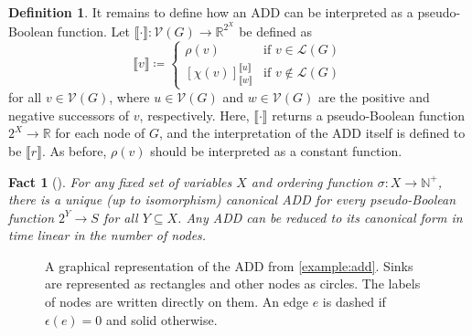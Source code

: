 \documentclass{article}
\newtheorem{fact}{Fact}
\theoremstyle{definition}
\newtheorem{definition}{Definition}
\theoremstyle{remark}
\begin{document}
\begin{definition}
  It remains to define how an ADD can be interpreted as a pseudo-Boolean
  function. Let $\llbracket \cdot \rrbracket\colon \mathcal{V}(G) \to
  \mathbb{R}^{2^X}$ be defined as
  \[
    \llbracket v \rrbracket \coloneqq
    \begin{cases}
      \rho(v) & \text{if } v \in \mathcal{L}(G) \\
      [\chi(v)]^{\llbracket u \rrbracket}_{\llbracket w \rrbracket} &
      \text{if } v \not\in \mathcal{L}(G)
    \end{cases}
  \]
  for all $v \in \mathcal{V}(G)$, where $u \in \mathcal{V}(G)$ and $w \in
  \mathcal{V}(G)$ are the positive and negative successors of $v$, respectively.
  Here, $\llbracket \cdot \rrbracket$ returns a pseudo-Boolean function $2^X \to
  \mathbb{R}$ for each node of $G$, and the interpretation of the ADD itself is
  defined to be $\llbracket r \rrbracket$. As before, $\rho(v)$ should be
  interpreted as a constant function.
\end{definition}

\begin{fact}[\cite{DBLP:journals/fmsd/BaharFGHMPS97}]
  For any fixed set of variables $X$ and ordering function $\sigma\colon X \to
  \mathbb{N}^+$, there is a unique (up to isomorphism) \emph{canonical} ADD for
  every pseudo-Boolean function $2^Y \to S$ for all $Y \subseteq X$. Any ADD can
  be \emph{reduced} to its canonical form in time linear in the number of nodes.
\end{fact}

\begin{figure}
  \centering
  \label{fig:add}
  \caption{A graphical representation of the ADD from \cref{example:add}. Sinks
    are represented as rectangles and other nodes as circles. The labels of
    nodes are written directly on them. An edge $e$ is dashed if $\epsilon(e) =
    0$ and solid otherwise.}
\end{figure}
\end{document}
